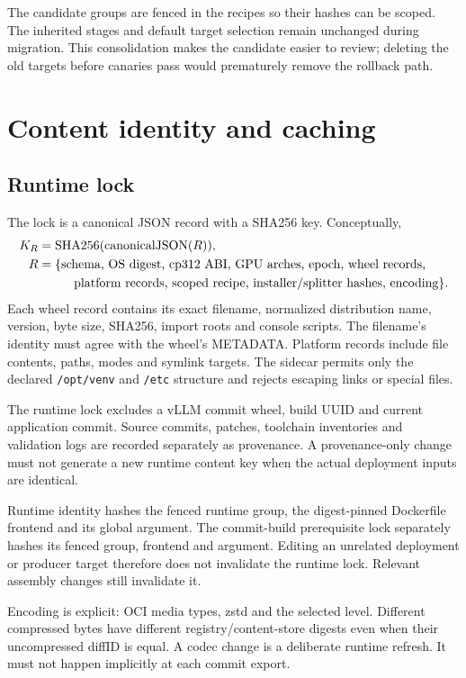 \documentclass[11pt,a4paper]{article}
\newcommand{\file}[1]{\nolinkurl{#1}}
\newcommand{\term}[1]{\texttt{\detokenize{#1}}}
\begin{document}
The candidate groups are fenced in the recipes so their hashes can be scoped.
The inherited stages and default target selection remain unchanged during
migration. This consolidation makes the candidate easier to review; deleting
the old targets before canaries pass would prematurely remove the rollback path.

\section{Content identity and caching}

\subsection{Runtime lock}

The lock is a canonical JSON record with a SHA256 key. Conceptually,
\begin{align*}
K_R &= \operatorname{SHA256}(\operatorname{canonicalJSON}(R)),\\
R &= \{\text{schema, OS digest, cp312 ABI, GPU arches, epoch, wheel records,}\\
  &\hspace{10mm}\text{platform records, scoped recipe, installer/splitter hashes,
  encoding}\}.
\end{align*}
Each wheel record contains its exact filename, normalized distribution name,
version, byte size, SHA256, import roots and console scripts. The filename's
identity must agree with the wheel's METADATA. Platform records include file
contents, paths, modes and symlink targets. The sidecar permits only the declared
\file{/opt/venv} and \file{/etc} structure and rejects escaping links or special
files.

The runtime lock excludes a vLLM commit wheel, build UUID and current application
commit. Source commits, patches, toolchain inventories and validation logs are
recorded separately as provenance. A provenance-only change must not generate a
new runtime content key when the actual deployment inputs are identical.

Runtime identity hashes the fenced runtime group, the digest-pinned Dockerfile
frontend and its global \term{OS_IMAGE} argument. The commit-build prerequisite
lock separately hashes its fenced group, frontend and \term{RUNTIME_IMAGE}
argument. Editing an unrelated deployment or producer target therefore does not
invalidate the runtime lock. Relevant assembly changes still invalidate it.

Encoding is explicit: OCI media types, zstd and the selected level. Different
compressed bytes have different registry/content-store digests even when their
uncompressed diffID is equal. A codec change is a deliberate runtime refresh.
It must not happen implicitly at each commit export.
\end{document}
